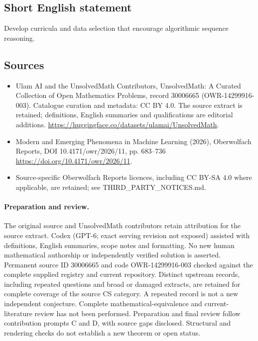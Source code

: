\documentclass[11pt]{article}
\begin{document}
\subsection{Short English statement}
Develop curricula and data selection that encourage algorithmic sequence reasoning.
\subsection{Sources}
\begin{itemize}
\item[\hypertarget{source:30006665:1}{S1}] Ulam AI and the UnsolvedMath Contributors, UnsolvedMath: A Curated Collection of Open Mathematics Problems, record 30006665 (OWR-14299916-003). Catalogue curation and metadata: CC BY 4.0. The source extract is retained; definitions, English summaries and qualifications are editorial additions.
\url{https://huggingface.co/datasets/ulamai/UnsolvedMath}.
\item[\hypertarget{source:30006665:2}{S2}] Modern and Emerging Phenomena in Machine Learning (2026), Oberwolfach Reports, DOI 10.4171/owr/2026/11, pp. 683--736
\url{https://doi.org/10.4171/owr/2026/11}.
\item Source-specific Oberwolfach Reports licences, including CC BY-SA 4.0 where applicable, are retained; see THIRD\_PARTY\_NOTICES.md.
\end{itemize}
\paragraph{Preparation and review.}
The original source and UnsolvedMath contributors retain attribution for the source extract. Codex (GPT-6; exact serving revision not exposed) assisted with definitions, English summaries, scope notes and formatting. No new human mathematical authorship or independently verified solution is asserted. Permanent source ID 30006665 and code OWR-14299916-003 checked against the complete supplied registry and current repository. Distinct upstream records, including repeated questions and broad or damaged extracts, are retained for complete coverage of the source CS category. A repeated record is not a new independent conjecture. Complete mathematical-equivalence and current-literature review has not been performed. Preparation and final review follow contribution prompts C and D, with source gaps disclosed. Structural and rendering checks do not establish a new theorem or open status.
\label{end:30006665}
\end{document}
